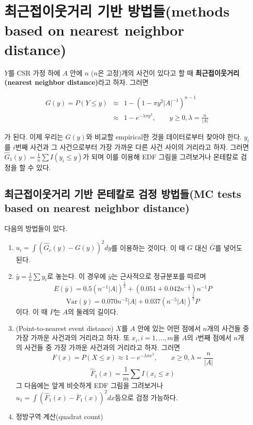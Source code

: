 \documentclass[b5paper,]{scrbook}
\theoremstyle{plain}
\theoremstyle{definition}
\numberwithin{equation}{section}
\begin{document}
\hypertarget{--methods-based-on-nearest-neighbor-distance}{%
\section{최근접이웃거리 기반 방법들(methods based on nearest neighbor distance)}\label{--methods-based-on-nearest-neighbor-distance}}

\(Y\)를 CSR 가정 하에 \(A\) 안에 \(n\) (\(n\)은 고정)개의 사건이 있다고 할 때 \textbf{최근접이웃거리(nearest neighbor distance)}라고 하자. 그러면

\begin{eqnarray*}
G(y)=P(Y\leq y)&\approx & 1-(1-\pi y^{2}|A|^{-1})^{n-1}\\
&\approx& 1-e^{-\lambda \pi y^{2}}, \qquad{y \geq 0, \lambda =\frac{n}{|A|}}
\end{eqnarray*}

가 된다. 이제 우리는 \(G(y)\)와 비교할 empirical한 것을 데이터로부터 찾아야 한다. \(y_{i}\)를 \(i\)번째 사건과 그 사건으로부터 가장 가까운 다른 사건 사이의 거리라고 하자. 그러면 \(\hat{G}_{1}(y)=\frac{1}{n}\sum I(y_{i} \leq y)\)가 되며 이를 이용해 EDF 그림을 그려보거나 몬테칼로 검정을 할 수 있다.

\hypertarget{----mc-tests-based-on-nearest-neighbor-distance}{%
\subsection{최근접이웃거리 기반 몬테칼로 검정 방법들(MC tests based on nearest neighbor distance)}\label{----mc-tests-based-on-nearest-neighbor-distance}}

다음의 방법들이 있다.

\begin{enumerate}
\def\labelenumi{\arabic{enumi}.}
\item
  \(u_{i}=\int (\hat{G}_{c}(y)-G(y))^{2}dy\)를 이용하는 것이다. 이 때 \(G\) 대신 \(\bar{G}\)를 넣어도 된다.
\item
  \citep{Clark1954} \(\bar{y}=\frac{1}{n}\sum y_{i}\)로 놓는다. 이 경우에 \(\bar{y}\)는 근사적으로 정규분포를 따르며
  \[E(\bar{y})=0.5(n^{-1}|A|)^{\frac{1}{2}} + (0.051 + 0.042 n^{-\frac{1}{2}})n^{-1}P\]
  \[\text{Var}(\bar{y})=0.070n^{-2}|A| + 0.037(n^{-5}|A|)^{\frac{1}{2}}P\]
  이다. 이 때 \(P\)는 \(A\)의 둘레의 길이다.
\item
  (Point-to-nearest event distance) \(X\)를 \(A\) 안에 있는 어떤 점에서 \(n\)개의 사건들 중 가장 가까운 사건과의 거리라고 하자. 또 \(x_{i}, i=1,\ldots ,m\)을 \(A\)의 \(i\)번째 점에서 \(n\)개의 사건들 중 가장 가까운 사건과의 거리라고 하자. 그러면
  \[F(x)=P(X\leq x) \approx 1 - e^{-\lambda \pi x^{2}}, \qquad{x \geq 0, \lambda = \frac{n}{|A|}}\]
  \[\hat{F}_{1}(x)=\frac{1}{m}\sum I(x_{i}\leq x)\]
  그 다음에는 앞게 비슷하게 EDF 그림을 그려보거나 \(u_{1}=\int (\hat{F}_{1}(x)-\bar{F}_{1}(x))^{2}dx\)등으로 검정 가능하다.
\item
  정방구역 계산(quadrat count)
\end{enumerate}
\end{document}
